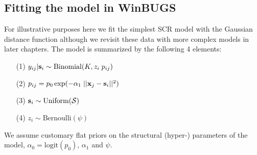 \subsection{Fitting the model in WinBUGS}

For illustrative purposes here we fit the simplest SCR model with the
Gaussian distance function although we revisit these data with more
complex models in later chapters. The model is summarized by the
following 4 elements:
\begin{itemize}
\item[(1)] $y_{ij}|{\bf s}_{i} \sim \mbox{Binomial}(K, z_{i}\; p_{ij})$
\item[(2)] $p_{ij} = p_{0} \exp(-\alpha_{1} \; ||{\bf x}_{j}-{\bf s}_{i}||^2)$
\item[(3)] ${\bf s}_{i} \sim \mbox{Uniform}({\cal S})$
\item[(4)] $z_{i} \sim \mbox{Bernoulli}(\psi)$
\end{itemize}
We assume customary flat priors on the structural (hyper-) parameters
of the model, $\alpha_{0} = \mbox{logit}(p_{0})$, $\alpha_{1}$ and
$\psi$.

